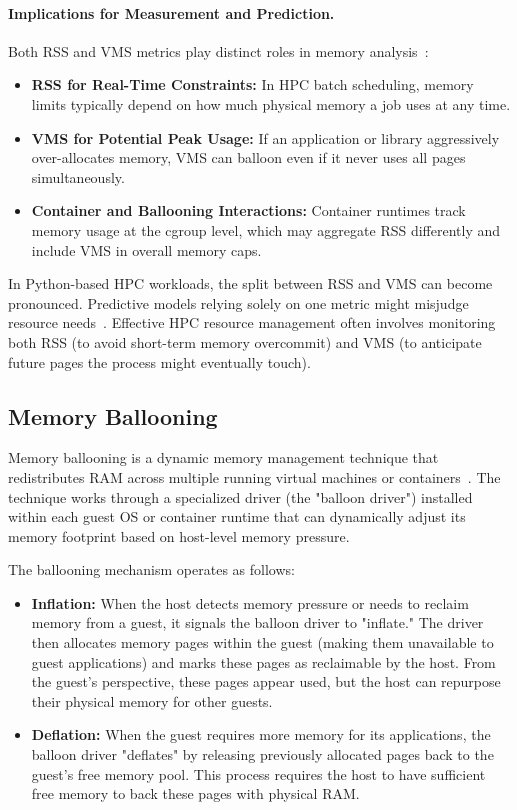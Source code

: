 \paragraph{Implications for Measurement and Prediction.}
Both \ac{RSS} and \ac{VMS} metrics play distinct roles in memory analysis~\cite{Nanjekye2023,Bader2023}:
\begin{itemize}
    \item \textbf{\ac{RSS} for Real-Time Constraints:} In \ac{HPC} batch scheduling, memory limits typically depend on how much physical memory a job uses at any time.
    \item \textbf{\ac{VMS} for Potential Peak Usage:} If an application or library aggressively over-allocates memory, \ac{VMS} can balloon even if it never uses all pages simultaneously.
    \item \textbf{Container and Ballooning Interactions:} Container runtimes track memory usage at the \ac{cgroup} level, which may aggregate \ac{RSS} differently and include \ac{VMS} in overall memory caps.
\end{itemize}

In Python-based \ac{HPC} workloads, the split between \ac{RSS} and \ac{VMS} can become pronounced.
Predictive models relying solely on one metric might misjudge resource needs~\cite{Bader2024}.
Effective \ac{HPC} resource management often involves monitoring both \ac{RSS} (to avoid short-term memory overcommit) and \ac{VMS} (to anticipate future pages the process might eventually touch).

\subsection{Memory Ballooning}
\label{subsec:fundamentals-memory-ballooning}

Memory ballooning is a dynamic memory management technique that redistributes RAM across multiple running virtual machines or containers~\cite{waldspurger-ballooning-2002}.
The technique works through a specialized driver (the "balloon driver") installed within each guest OS or container runtime that can dynamically adjust its memory footprint based on host-level memory pressure.

The ballooning mechanism operates as follows:
\begin{itemize}
    \item \textbf{Inflation:} When the host detects memory pressure or needs to reclaim memory from a guest, it signals the balloon driver to "inflate." The driver then allocates memory pages within the guest (making them unavailable to guest applications) and marks these pages as reclaimable by the host. From the guest's perspective, these pages appear used, but the host can repurpose their physical memory for other guests.
    \item \textbf{Deflation:} When the guest requires more memory for its applications, the balloon driver "deflates" by releasing previously allocated pages back to the guest's free memory pool. This process requires the host to have sufficient free memory to back these pages with physical RAM.
\end{itemize}

